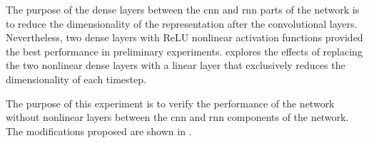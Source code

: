 
The purpose of the dense layers between the \gls{cnn} and
\gls{rnn} parts of the network is to reduce the
dimensionality of the representation after the convolutional
layers. Nevertheless, two dense layers with ReLU nonlinear
activation functions provided the best performance in
preliminary experiments. 
explores the effects of replacing the two nonlinear dense
layers with a linear layer that exclusively reduces the
dimensionality of each timestep.

The purpose of this experiment is to verify the performance
of the network without nonlinear layers between the
\gls{cnn} and \gls{rnn} components of the network. The
modifications proposed are shown in .

